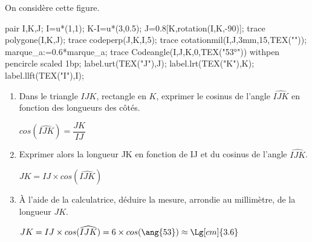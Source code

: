 \begin{corrige}
    On considère cette figure.

    \begin{Geometrie}
        pair I,K,J;
        I=u*(1,1);
        K-I=u*(3,0.5);
        J=0.8[K,rotation(I,K,-90)];
        trace polygone(I,K,J);
        trace codeperp(J,K,I,5);
        trace cotationmil(I,J,3mm,15,TEX(""));
        marque_a:=0.6*marque_a;                
        trace Codeangle(I,J,K,0,TEX("\ang{53}")) withpen pencircle scaled 1bp;
        label.urt(TEX("J"),J);
        label.lrt(TEX("K"),K);
        label.llft(TEX("I"),I);
    \end{Geometrie}

    \begin{enumerate}
        \item Dans le triangle $IJK$, rectangle en $K$, exprimer le cosinus de l'angle $\widehat{IJK}$ en fonction des longueurs des côtés.
        
        {\color{red} $cos(\widehat{IJK})=\dfrac{JK}{IJ}$}
        \item Exprimer alors la longueur JK en fonction de IJ et du cosinus de l'angle $\widehat{IJK}$.
        
        {\color{red} $JK=IJ\times cos(\widehat{IJK})$}
        \item À l'aide de la calculatrice, déduire la mesure, arrondie au millimètre, de la longueur $JK$.
        
        {\color{red} $JK=IJ\times cos(\widehat{IJK})=6\times cos(\ang{53})\approx\Lg[cm]{3.6}$}
    \end{enumerate}
\end{corrige}

